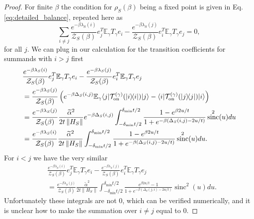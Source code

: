 \documentclass[
 amsmath,amssymb,
 aps,
onecolumn, 
nofootinbib]{revtex4-2}
\newcommand{\on}{\rm on}
\newcommand{\ket}[1]{|#1\rangle}
\newcommand{\bra}[1]{\langle #1|}
\newcommand{\ketbra}[2]{| #1\rangle\! \langle #2|}
\newcommand{\norm}[1]{\left\| #1 \right\|}
\newcommand{\EE}{\mathbb{E}}
\newcommand{\TT}{\mathcal{T}}
\newcommand{\partfun}{\mathcal{Z}}
\DeclareMathOperator{\sinc}{sinc}
\begin{document}
\begin{proof}
    For finite $\beta$ the condition for $\rho_S(\beta)$ being a fixed point is given in Eq. \eqref{eq:detailed_balance}, repeated here as
    \begin{equation}
        \sum_{i \neq j} \frac{e^{-\beta \lambda_S(i)}}{\partfun_S(\beta)} e_j^T \EE_\gamma T_\gamma e_i - \frac{e^{-\beta \lambda_S(j)}}{\partfun_S(\beta)}  e_i^T \EE_\gamma T_\gamma e_j = 0,
    \end{equation}
    for all $j$. We can plug in our calculation for the transition coefficients for summands with $i > j$ first
    \begin{align}
        &\frac{e^{-\beta \lambda_S(i)}}{\partfun_S(\beta)} e_j^T \EE_\gamma T_\gamma e_i - \frac{e^{-\beta \lambda_S(j)}}{\partfun_S(\beta)}  e_i^T \EE_\gamma T_\gamma e_j \nonumber \\ 
        &= \frac{e^{-\beta \lambda_S(j)}}{\partfun_S(\beta)} \left( e^{-\beta \Delta_S(i,j)} \EE_\gamma \bra{j} \TT_{\on}^{(\gamma)}(\ketbra{i}{i})\ket{j} - \bra{i} \TT_{\on}^{(\gamma)}(\ketbra{j}{j})\ket{i} \right) \\
        &= \frac{e^{-\beta \lambda_S(j)}}{\partfun_S(\beta)} \frac{\widetilde{\alpha}^2}{2 t \norm{H_S}} e^{-\beta \Delta_S(i,j)} \int_{-\delta_{\min} t /2 }^{\delta_{\min} t/ 2} \frac{1 - e^{\beta 2 u / t}}{1 + e^{-\beta(\Delta_S(i,j) - 2u/t)}} \sinc^2(u) du \\
        &= \frac{e^{-\beta \lambda_S(i)}}{\partfun_S(\beta)} \frac{\widetilde{\alpha}^2}{2 t \norm{H_S}} \int_{-\delta_{\min} t /2 }^{\delta_{\min} t/ 2} \frac{1 - e^{\beta 2 u / t}}{1 + e^{-\beta(\Delta_S(i,j) - 2u/t)}} \sinc^2(u) du. \label{eq:zero_knowledge_tmp_1}
    \end{align}
    For $i < j$ we have the very similar
    \begin{align}
        &\frac{e^{-\beta \lambda_S(i)}}{\partfun_S(\beta)} e_j^T \EE_\gamma T_\gamma e_i - \frac{e^{-\beta \lambda_S(j)}}{\partfun_S(\beta)}  e_i^T \EE_\gamma T_\gamma e_j \nonumber \\ 
        &= \frac{e^{-\beta \lambda_S(j)}}{\partfun_S(\beta)} \frac{\widetilde{\alpha}^2}{2 t \norm{H_S}} \int_{-\delta_{\min} t /2 }^{\delta_{\min} t/ 2} \frac{ e^{\beta 2 u / t} - 1}{1 + e^{-\beta(\Delta_S(j, i) - 2u/t)}} \sinc^2(u) du. \label{eq:zero_knowledge_tmp_2}
    \end{align}
    Unfortunately these integrals are not 0, which can be verified numerically, and it is unclear how to make the summation over $i \neq j$ equal to 0. 
    

\end{proof}
\end{document}
